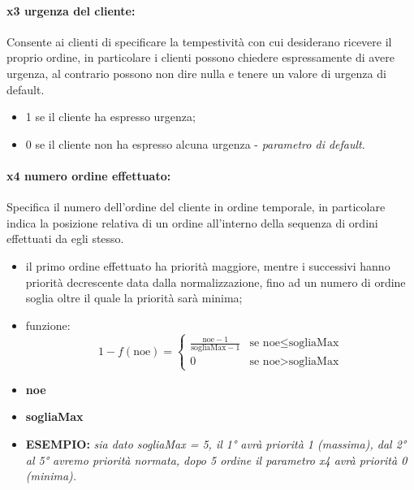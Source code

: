 \paragraph{x3 urgenza del cliente:}
Consente ai clienti di specificare la tempestività con cui desiderano ricevere il proprio ordine, in particolare i clienti possono chiedere espressamente di avere urgenza, al contrario possono non dire nulla e tenere un valore di urgenza di default.
\begin{itemize}
	\item 1 se il cliente ha espresso urgenza;
	\item 0 se il cliente non ha espresso alcuna urgenza - \textit{parametro di default}.
\end{itemize}

\paragraph{x4 numero ordine effettuato:}
Specifica il numero dell’ordine del cliente in ordine temporale, in particolare indica la posizione relativa di un ordine all'interno della sequenza di ordini effettuati da egli stesso.
\begin{itemize}

	\item il primo ordine effettuato ha priorità maggiore, mentre i successivi hanno priorità decrescente data dalla normalizzazione, fino ad un numero di ordine soglia oltre il quale la priorità sarà minima;
	
	\item funzione: \[1 - f(\text{noe}) = \begin{cases} \frac{{\text{noe} - 1}}{{\text{sogliaMax} - 1}} & \text{se } \text{noe} \leq \text{sogliaMax} \\ 0 & \text{se } \text{noe} > \text{sogliaMax} \end{cases} \]


	\item \textbf{noe} 
	\item \textbf{sogliaMax} 
	\item \textbf{ESEMPIO: } \textit{sia dato sogliaMax = 5, il 1° avrà priorità 1 (massima), dal 2° al 5° avremo priorità normata, dopo 5 ordine il parametro x4 avrà priorità 0 (minima).}
\end{itemize}

